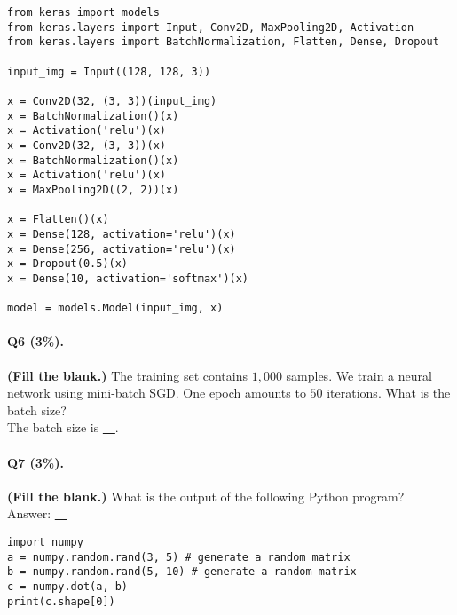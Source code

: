 \documentclass[11pt]{article}
\numberwithin{equation}{section}
\begin{document}
\begin{lstlisting}
from keras import models
from keras.layers import Input, Conv2D, MaxPooling2D, Activation
from keras.layers import BatchNormalization, Flatten, Dense, Dropout

input_img = Input((128, 128, 3))

x = Conv2D(32, (3, 3))(input_img)
x = BatchNormalization()(x)
x = Activation('relu')(x)
x = Conv2D(32, (3, 3))(x)
x = BatchNormalization()(x)
x = Activation('relu')(x)
x = MaxPooling2D((2, 2))(x)

x = Flatten()(x)
x = Dense(128, activation='relu')(x)
x = Dense(256, activation='relu')(x)
x = Dropout(0.5)(x)
x = Dense(10, activation='softmax')(x)

model = models.Model(input_img, x)
\end{lstlisting}
\vspace{3mm}




\paragraph{Q6 (3\%).} 
{\bf (Fill the blank.)}
The training set contains $1,000$ samples.
We train a neural network using mini-batch SGD.
One epoch amounts to $50$ iterations.
What is the batch size? \\
The batch size is \underline{~\qquad\qquad\qquad~}. \\




\paragraph{Q7 (3\%).} 
{\bf (Fill the blank.)}
What is the output of the following Python program?\\
Answer: \underline{~\qquad\qquad\qquad~}



\begin{lstlisting}
import numpy
a = numpy.random.rand(3, 5) # generate a random matrix
b = numpy.random.rand(5, 10) # generate a random matrix
c = numpy.dot(a, b)
print(c.shape[0])

\end{lstlisting}
\vspace{3mm}
\end{document}
